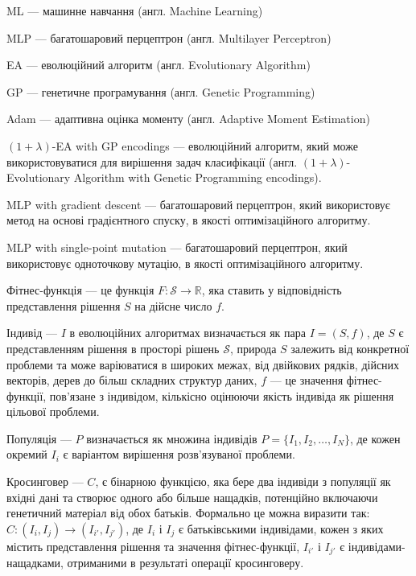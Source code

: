 ML --- машинне навчання (англ. Machine Learning)

MLP --- багатошаровий перцептрон (англ. Multilayer Perceptron)

EA --- еволюційний алгоритм (англ. Evolutionary Algorithm)

GP --- генетичне програмування (англ. Genetic Programming)

Adam --- адаптивна оцінка моменту (англ. Adaptive Moment Estimation)

$(1+\lambda)$-EA with GP encodings --- еволюційний алгоритм, який може використовуватися для вирішення задач класифікації (англ. $(1+\lambda)$-Evolutionary Algorithm with Genetic Programming encodings).

MLP with gradient descent --- багатошаровий перцептрон, який використовує метод на основі градієнтного спуску, в якості оптимізаційного алгоритму.

MLP with single-point mutation --- багатошаровий перцептрон, який використовує одноточкову мутацію, в якості оптимізаційного алгоритму.

Фітнес-функція --- це функція \( F: \mathcal{S} \rightarrow \mathbb{R} \), яка ставить у відповідність представлення рішення \( S \) на дійсне число \( f \).

Індивід --- \( I \) в еволюційних алгоритмах визначається як пара \( I = (S, f) \), де \( S \) є представленням рішення в просторі рішень \( \mathcal{S} \), природа \( S \) залежить від конкретної проблеми та може варіюватися в широких межах, від двійкових рядків, дійсних векторів, дерев до більш складних структур даних, \( f \) — це значення фітнес-функції, пов’язане з індивідом, кількісно оцінюючи якість індивіда як рішення цільової проблеми.

Популяція --- \( P \) визначається як множина індивідів \( P = \{I_1, I_2, \ldots, I_N\} \), де кожен окремий \( I_i \) є варіантом вирішення розв'язуваної проблеми.

Кросинговер --- \( C \), є бінарною функцією, яка бере два індивіди з популяції як вхідні дані та створює одного або більше нащадків, потенційно включаючи генетичний матеріал від обох батьків. Формально це можна виразити так: \( C: (I_i, I_j) \rightarrow (I_{i'}, I_{j'}) \), де \( I_i \) і \( I_j \) є батьківськими індивідами, кожен з яких містить представлення рішення та значення фітнес-функції, \( I_{i'} \) і \( I_{j'} \) є індивідами-нащадками, отриманими в результаті операції кросинговеру.

